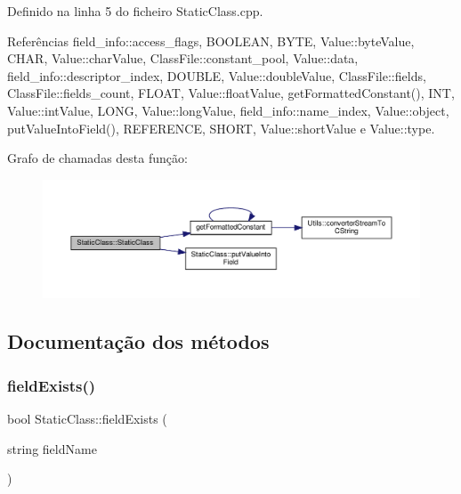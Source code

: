 Definido na linha 5 do ficheiro Static\+Class.\+cpp.



Referências field\+\_\+info\+::access\+\_\+flags, B\+O\+O\+L\+E\+AN, B\+Y\+TE, Value\+::byte\+Value, C\+H\+AR, Value\+::char\+Value, Class\+File\+::constant\+\_\+pool, Value\+::data, field\+\_\+info\+::descriptor\+\_\+index, D\+O\+U\+B\+LE, Value\+::double\+Value, Class\+File\+::fields, Class\+File\+::fields\+\_\+count, F\+L\+O\+AT, Value\+::float\+Value, get\+Formatted\+Constant(), I\+NT, Value\+::int\+Value, L\+O\+NG, Value\+::long\+Value, field\+\_\+info\+::name\+\_\+index, Value\+::object, put\+Value\+Into\+Field(), R\+E\+F\+E\+R\+E\+N\+CE, S\+H\+O\+RT, Value\+::short\+Value e Value\+::type.

Grafo de chamadas desta função\+:\nopagebreak
\begin{figure}[H]
\begin{center}
\leavevmode
\includegraphics[width=350pt]{classStaticClass_a6c0e4d8842888a97160f1e815c8e6ac3_cgraph}
\end{center}
\end{figure}


\subsection{Documentação dos métodos}
\mbox{\label{classStaticClass_a4d2f7ca3157461323a6e471328ed7092}} 
\subsubsection{\texorpdfstring{field\+Exists()}{fieldExists()}}
{\footnotesize\ttfamily bool Static\+Class\+::field\+Exists (\begin{DoxyParamCaption}\item[{string}]{field\+Name }\end{DoxyParamCaption})}



